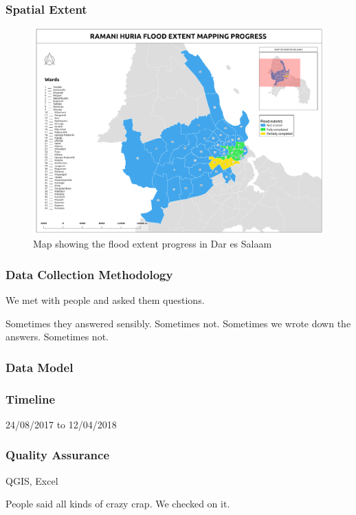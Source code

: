 \documentclass[a4paper,12pt,twoside]{article}
\begin{document}
\subsubsection{Spatial Extent}
\begin{figure}[h]
  \color{RHgreen}\caption{Map showing the flood extent progress in Dar es Salaam}
  \centering
  \includegraphics[width=1\textwidth]{images/RH_Flood_Extent_Progress.png}
\end{figure}

\subsubsection{Data Collection Methodology}

We met with people and asked them questions.

Sometimes they answered sensibly. Sometimes not. Sometimes we wrote down the answers. Sometimes not.

\subsubsection{Data Model}

\subsubsection{Timeline}
24/08/2017 to 12/04/2018

\subsubsection{Quality Assurance}
QGIS, Excel

\bigskip
People said all kinds of crazy crap. We checked on it.
\end{document}

